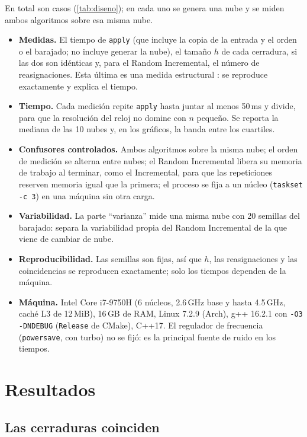 \documentclass[11pt,letterpaper]{article}
\newcommand{\inc}{\textsf{Incremental}}
\newcommand{\ran}{\textsf{Random Incremental}}
\newcommand{\code}[1]{\texttt{#1}}
\begin{document}
En total son \resCasos{} casos (\cref{tab:diseno}); en cada uno se genera una
nube y se miden ambos algoritmos sobre esa misma nube.

\begin{itemize}
  \item \textbf{Medidas.} El tiempo de \code{apply} (que incluye la copia de la
        entrada y el orden o el barajado; no incluye generar la nube), el
        tamaño $h$ de cada cerradura, si las dos son idénticas y, para el
        \ran, el número de reasignaciones. Esta última es una medida
        estructural \cite{moret}: se reproduce exactamente y explica el tiempo.
  \item \textbf{Tiempo.} Cada medición repite \code{apply} hasta juntar al
        menos 50\,ms y divide, para que la resolución del reloj no domine con
        $n$ pequeño. Se reporta la mediana
        de las 10 nubes y, en los gráficos, la banda entre los cuartiles.
  \item \textbf{Confusores controlados.} Ambos algoritmos sobre la misma nube; el
        orden de medición se alterna entre nubes; el \ran{} libera su memoria
        de trabajo al terminar, como el \inc, para que las repeticiones
        reserven memoria igual que la primera; el proceso se fija a un núcleo
        (\code{taskset -c 3}) en una máquina sin otra carga.
  \item \textbf{Variabilidad.} La parte ``varianza'' mide una misma nube con 20
        semillas del barajado: separa la variabilidad propia del \ran{} de la
        que viene de cambiar de nube.
  \item \textbf{Reproducibilidad.} Las semillas son fijas, así que $h$, las
        reasignaciones y las coincidencias se reproducen exactamente; solo los
        tiempos dependen de la máquina.
  \item \textbf{Máquina.} Intel Core i7-9750H (6 núcleos, 2.6\,GHz base y hasta
        4.5\,GHz, caché L3 de 12\,MiB), 16\,GB de RAM, Linux 7.2.9 (Arch), g++
        16.2.1 con \code{-O3 -DNDEBUG} (\code{Release} de CMake), C++17. El
        regulador de frecuencia (\code{powersave}, con turbo) no se fijó: es la
        principal fuente de ruido en los tiempos.
\end{itemize}


\section{Resultados}

\subsection{Las cerraduras coinciden}
\end{document}
